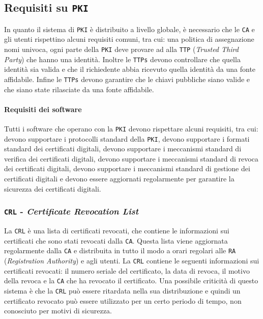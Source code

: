     \subsection{Requisiti su \texttt{PKI}}
        In quanto il sistema di \texttt{PKI} è distribuito a livello globale, è necessario che le \texttt{CA} e gli utenti rispettino alcuni requisiti comuni, tra cui: una politica di assegnazione nomi univoca, ogni parte della \texttt{PKI} deve provare ad alla \texttt{TTP} (\textit{Trusted Third Party}) che hanno una identità. Inoltre le \texttt{TTPs} devono controllare che quella identità sia valida e che il richiedente abbia ricevuto quella identità da una fonte affidabile. Infine le \texttt{TTPs} devono garantire che le chiavi pubbliche siano valide e che siano state rilasciate da una fonte affidabile.
        \paragraph{Requisiti dei software} Tutti i software che operano con la \texttt{PKI} devono rispettare alcuni requisiti, tra cui: devono supportare i protocolli standard della \texttt{PKI}, devono supportare i formati standard dei certificati digitali, devono supportare i meccanismi standard di verifica dei certificati digitali, devono supportare i meccanismi standard di revoca dei certificati digitali, devono supportare i meccanismi standard di gestione dei certificati digitali e devono essere aggiornati regolarmente per garantire la sicurezza dei certificati digitali.
        \subsubsection{\texttt{CRL} - \textit{Certificate Revocation List}}
            La \texttt{CRL} è una lista di certificati revocati, che contiene le informazioni sui certificati che sono stati revocati dalla \texttt{CA}. Questa lista viene aggiornata regolarmente dalla \texttt{CA} e distribuita in tutto il modo a orari regolari alle \texttt{RA} (\textit{Registration Authority}) e agli utenti. La \texttt{CRL} contiene le seguenti informazioni sui certificati revocati: il numero seriale del certificato, la data di revoca, il motivo della revoca e la \texttt{CA} che ha revocato il certificato. Una possibile criticità di questo sistema è che la \texttt{CRL} può essere ritardata nella sua distribuzione e quindi un certificato revocato può essere utilizzato per un certo periodo di tempo, non conosciuto per motivi di sicurezza.
